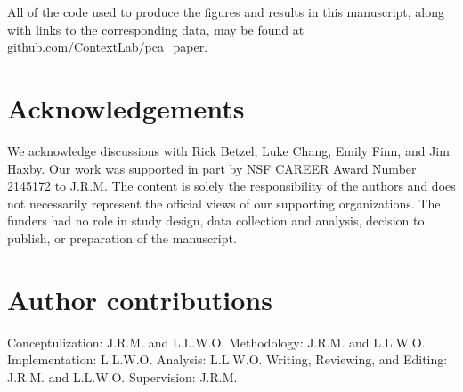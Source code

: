 \documentclass[english, 11pt]{article}
\begin{document}
All of the code used to produce the figures and results in this manuscript,
along with links to the corresponding data, may be found at
\href{https://github.com/ContextLab/pca_paper}{github.com/ContextLab/pca\_paper}.

\section*{Acknowledgements} 

We acknowledge discussions with Rick Betzel, Luke Chang, Emily Finn, and Jim
Haxby. Our work was supported in part by NSF CAREER Award Number 2145172 to
J.R.M. The content is solely the responsibility of the authors and does not
necessarily represent the official views of our supporting organizations. The
funders had no role in study design, data collection and analysis, decision to
publish, or preparation of the manuscript.


\section*{Author contributions} 

Conceptulization: J.R.M. and L.L.W.O. Methodology: J.R.M. and L.L.W.O.
Implementation: L.L.W.O. Analysis: L.L.W.O. Writing, Reviewing, and Editing:
J.R.M. and L.L.W.O. Supervision: J.R.M.



\end{document}
